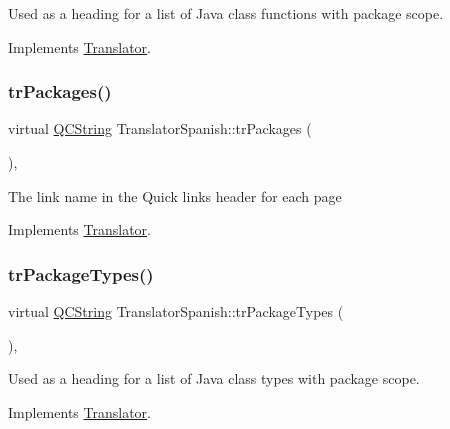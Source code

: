 Used as a heading for a list of Java class functions with package scope. 

Implements \mbox{\hyperlink{class_translator}{Translator}}.

\mbox{\label{class_translator_spanish_a4d1a4bd1b4c16d21891b53452eec946e}} 
\subsubsection{\texorpdfstring{trPackages()}{trPackages()}}
{\footnotesize\ttfamily virtual \mbox{\hyperlink{class_q_c_string}{Q\+C\+String}} Translator\+Spanish\+::tr\+Packages (\begin{DoxyParamCaption}{ }\end{DoxyParamCaption})\hspace{0.3cm}{\ttfamily [inline]}, {\ttfamily [virtual]}}

The link name in the Quick links header for each page 

Implements \mbox{\hyperlink{class_translator}{Translator}}.

\mbox{\label{class_translator_spanish_a1f69f84fc225b8e2e1cccb347a3d942a}} 
\subsubsection{\texorpdfstring{trPackageTypes()}{trPackageTypes()}}
{\footnotesize\ttfamily virtual \mbox{\hyperlink{class_q_c_string}{Q\+C\+String}} Translator\+Spanish\+::tr\+Package\+Types (\begin{DoxyParamCaption}{ }\end{DoxyParamCaption})\hspace{0.3cm}{\ttfamily [inline]}, {\ttfamily [virtual]}}

Used as a heading for a list of Java class types with package scope. 

Implements \mbox{\hyperlink{class_translator}{Translator}}.

\mbox{\label{class_translator_spanish_a2501527087aeaa66b86b8b1c328912f2}} 
